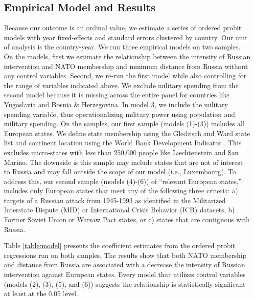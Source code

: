 \documentclass[11pt,letterpaper,pdftex,dvipsnames,table]{article}
\begin{document}
\subsection{Empirical Model and Results}
Because our outcome is an ordinal value, we estimate a series of ordered probit models with year fixed-effects and standard errors clustered by country. Our unit of analysis is the country-year. We run three empirical models on two samples. On the models, first we estimate the relationship between the intensity of Russian intervention and NATO membership and minimum distance from Russia without any control variables. Second, we re-run the first model while also controlling for the range of variables indicated above. We exclude military spending from the second model because it is missing across the entire panel for countries like Yugoslavia and Bosnia \& Herzegovina. In model 3, we include the military spending variable, thus operationalizing military power using population and military spending. On the samples, our first sample (models (1)-(3)) includes all European states. We define state membership using the Gleditsch and Ward state list and continent location using the World Bank Development Indicator \citep{gleditsch_revisedlistindependent_1999}. This excludes micro-states with less than 250,000 people like Liechtenstein and San Marino. The downside is this sample may include states that are not of interest to Russia and may fall outside the scope of our model (i.e., Luxembourg). To address this, our second sample (models (4)-(6)) of ``relevant European states,'' includes only European states that meet any of the following three criteria: a) targets of a Russian attack from 1945-1993 as identified in the Militarized Interstate Dispute (MID) or International Crisis Behavior (ICB) datasets, b) Former Soviet Union or Warsaw Pact states, or c) states that are contiguous with Russia.



Table \ref{table:model} presents the coefficient estimates from the ordered probit regressions run on both samples. The results show that both NATO membership and distance from Russia are associated with a decrease the intensity of Russian intervention against European states. Every model that utilizes control variables (models (2), (3), (5), and (6)) suggests the relationship is statistically significant at least at the 0.05 level.
\end{document}
